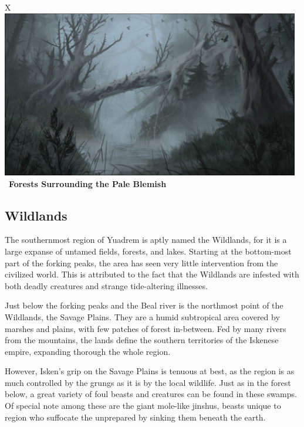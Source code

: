 
\begin{table}[t]%
    \begin{DndTable}[width=\linewidth]{X}
        \centering
        \includegraphics[width=0.98\textwidth]{01yuadrem/img/16pale_blemish.png} \
        \centering \large{\textbf{Forests Surrounding the Pale Blemish}}
    \end{DndTable}
\end{table}

\subsection*{Wildlands} \label{ssec::wildlands}

The southernmost region of Yuadrem is aptly named the Wildlands, for it is a large expanse of untamed fields, forests, and lakes.
Starting at the bottom-most part of the forking peaks, the area has seen very little intervention from the civilized world.
This is attributed to the fact that the Wildlands are infested with both deadly creatures and strange tide-altering illnesses.

Just below the forking peaks and the Beal river is the northmost point of the Wildlands, the Savage Plains.
They are a humid subtropical area covered by marshes and plains, with few patches of forest in-between.
Fed by many rivers from the mountains, the lands define the southern territories of the Iskenese empire, expanding thorough the whole region.

However, Isken's grip on the Savage Plains is tenuous at best, as the region is as much controlled by the grungs as it is by the local wildlife.
Just as in the forest below, a great variety of foul beasts and creatures can be found in these swamps.
Of special note among these are the giant mole-like jinshus, beasts unique to region who suffocate the unprepared by sinking them beneath the earth.

